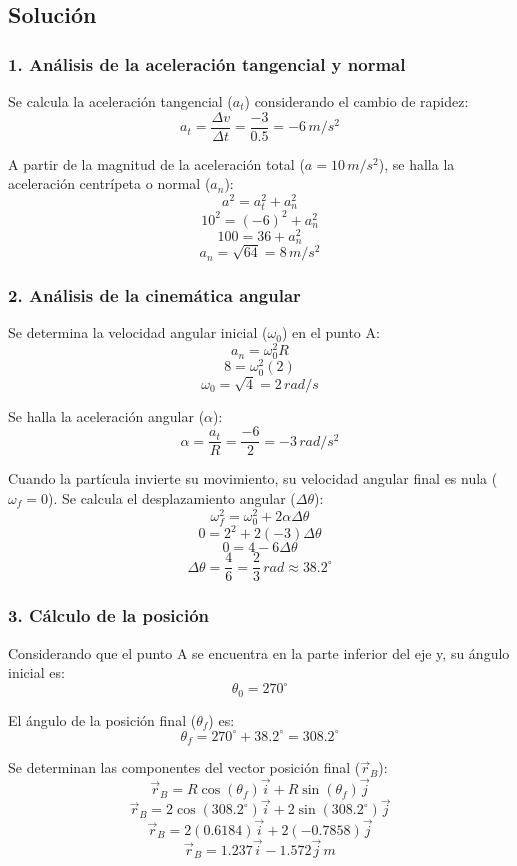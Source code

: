 \documentclass[12pt, a4paper]{article}
\begin{document}
\subsection*{Solución}

\subsubsection*{1. Análisis de la aceleración tangencial y normal}
Se calcula la aceleración tangencial ($a_t$) considerando el cambio de rapidez:
$$ a_t = \frac{\Delta v}{\Delta t} = \frac{-3}{0.5} = -6 \, \si{m/s^2} $$

A partir de la magnitud de la aceleración total ($a = 10 \, \si{m/s^2}$), se halla la aceleración centrípeta o normal ($a_n$):
$$ a^2 = a_t^2 + a_n^2 $$
$$ 10^2 = (-6)^2 + a_n^2 $$
$$ 100 = 36 + a_n^2 $$
$$ a_n = \sqrt{64} = 8 \, \si{m/s^2} $$

\subsubsection*{2. Análisis de la cinemática angular}
Se determina la velocidad angular inicial ($\omega_0$) en el punto A:
$$ a_n = \omega_0^2 R $$
$$ 8 = \omega_0^2 (2) $$
$$ \omega_0 = \sqrt{4} = 2 \, \si{rad/s} $$

Se halla la aceleración angular ($\alpha$):
$$ \alpha = \frac{a_t}{R} = \frac{-6}{2} = -3 \, \si{rad/s^2} $$

Cuando la partícula invierte su movimiento, su velocidad angular final es nula ($\omega_f = 0$). Se calcula el desplazamiento angular ($\Delta\theta$):
$$ \omega_f^2 = \omega_0^2 + 2\alpha \Delta\theta $$
$$ 0 = 2^2 + 2(-3)\Delta\theta $$
$$ 0 = 4 - 6\Delta\theta $$
$$ \Delta\theta = \frac{4}{6} = \frac{2}{3} \, \si{rad} \approx 38.2^\circ $$

\subsubsection*{3. Cálculo de la posición}
Considerando que el punto A se encuentra en la parte inferior del eje y, su ángulo inicial es:
$$ \theta_0 = 270^\circ $$

El ángulo de la posición final ($\theta_f$) es:
$$ \theta_f = 270^\circ + 38.2^\circ = 308.2^\circ $$

Se determinan las componentes del vector posición final ($\vec{r}_B$):
$$ \vec{r}_B = R\cos(\theta_f)\vec{i} + R\sin(\theta_f)\vec{j} $$
$$ \vec{r}_B = 2\cos(308.2^\circ)\vec{i} + 2\sin(308.2^\circ)\vec{j} $$
$$ \vec{r}_B = 2(0.6184)\vec{i} + 2(-0.7858)\vec{j} $$
$$ \vec{r}_B = 1.237\vec{i} - 1.572\vec{j} \, \si{m} $$
\end{document}
